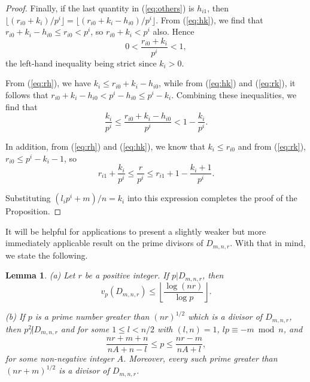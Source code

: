 \documentclass{jT}
\newtheorem{lemma}[theorem]{Lemma}
\theoremstyle{definition}
\begin{document}
\begin{proof}
Finally, if the last quantity in (\ref{eq:others}) is $h_{i1}$, then
$\lfloor (r_{i0}+k_{i})/p^{i} \rfloor = \lfloor (r_{i0}+k_{i}-h_{i0})/p^{i} \rfloor$.
From (\ref{eq:hk}), we find that $r_{i0}+k_{i}-h_{i0} \leq r_{i0} 
< p^{i}$, so $r_{i0}+k_{i} < p^{i}$ also. Hence 
\begin{equation}
\label{eq:rk}
0 < \frac{r_{i0}+k_{i}}{p^{i}} < 1, 
\end{equation}
the left-hand inequality being strict since $k_{i} > 0$. 

From (\ref{eq:rh}), we have $k_{i} \leq r_{i0}+k_{i}-h_{i0}$, 
while from (\ref{eq:hk}) and (\ref{eq:rk}), it follows that  
$r_{i0}+k_{i}-h_{i0} < p^{i}-h_{i0} \leq p^{i}-k_{i}$. Combining 
these inequalities, we find that 
\begin{displaymath}
\frac{k_{i}}{p^{i}} \leq \frac{r_{i0}+k_{i}-h_{i0}}{p^{i}} 
< 1 - \frac{k_{i}}{p^{i}}. 
\end{displaymath}

In addition, from (\ref{eq:rh}) and (\ref{eq:hk}), 
we know that $k_{i} \leq r_{i0}$ and from (\ref{eq:rk}), 
$r_{i0} \leq p^{i}-k_{i}-1$, so 
\begin{displaymath}
r_{i1} + \frac{k_{i}}{p^{i}} \leq \frac{r}{p^{i}} 
\leq r_{i1} + 1 - \frac{k_{i}+1}{p^{i}}. 
\end{displaymath}

Substituting $(l_{i}p^{i}+m)/n = k_{i}$ into this expression
completes the proof of the Proposition.
\end{proof}

It will be helpful for applications to present a slightly weaker but more
immediately applicable result on the prime divisors of $D_{m,n,r}$. With
that in mind, we state the following.

\begin{lemma}
\label{lem:denom-gen}
{\rm (a)} Let $r$ be a positive integer. If 
$p|D_{m,n,r}$, then
\begin{displaymath}
v_{p} \left( D_{m,n,r} \right) 
\leq \left\lfloor \frac{\log (nr)}{\log p} \right\rfloor.
\end{displaymath}

\noindent
{\rm (b)} If $p$ is a prime number greater than $(nr)^{1/2}$ 
which is a divisor of $D_{m,n,r}$, then $p^{2} \not| D_{m,n,r}$
and for some $1 \leq l < n/2$ with $(l,n)=1$, $lp \equiv -m \bmod n$, 
and 
\begin{equation}
\label{eq:pcond-gen}
\frac{nr+m+n}{nA+n-l} \leq p \leq \frac{nr-m}{nA+l},  
\end{equation}
for some non-negative integer $A$. Moreover, every such prime 
greater than $(nr+m)^{1/2}$ is a divisor of $D_{m,n,r}$.
\end{lemma}
\end{document}
